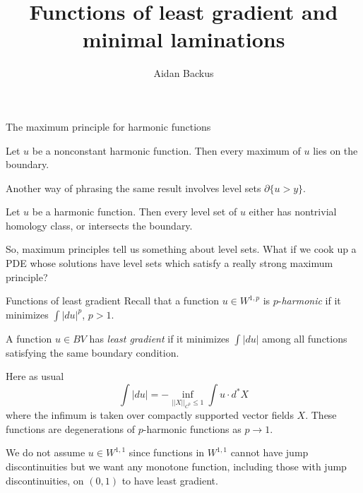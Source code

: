 \documentclass[10pt]{beamer}
\begin{document}
\title{Functions of least gradient and minimal laminations}
\author{Aidan Backus}
\begin{frame}
    \titlepage
\end{frame}

\begin{frame}{The maximum principle for harmonic functions}
\begin{theorem}
    Let $u$ be a nonconstant harmonic function.
    Then every maximum of $u$ lies on the boundary.
\end{theorem}

Another way of phrasing the same result involves level sets $\partial\{u > y\}$.

\begin{theorem}
    Let $u$ be a harmonic function.
    Then every level set of $u$ either has nontrivial homology class, or intersects the boundary.
\end{theorem}

So, maximum principles tell us something about level sets.
What if we cook up a PDE whose solutions have level sets which satisfy a really strong maximum principle?
\end{frame}

\begin{frame}{Functions of least gradient}
Recall that a function $u \in W^{1, p}$ is $p$-\emph{harmonic} if it minimizes $\int |du|^p$, $p > 1$.

\begin{definition}
    A function $u \in BV$ has \emph{least gradient} if it minimizes $\int |du|$ among all functions satisfying the same boundary condition.
\end{definition}

Here as usual 
$$\int |du| = -\inf_{||X||_{C^0} \leq 1} \int u \cdot d^*X$$
where the infimum is taken over compactly supported vector fields $X$.
These functions are degenerations of $p$-harmonic functions as $p \to 1$.

We do not assume $u \in W^{1, 1}$ since functions in $W^{1, 1}$ cannot have jump discontinuities but we want any monotone function, including those with jump discontinuities, on $(0, 1)$ to have least gradient.
\end{frame}
\end{document}
